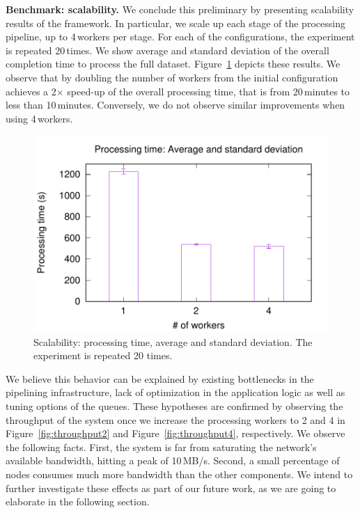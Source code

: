 \textbf{Benchmark: scalability.} We conclude this preliminary by presenting scalability results of the \SYS framework.
In particular, we scale up each stage of the processing pipeline, up to 4\,workers per stage.
For each of the configurations, the experiment is repeated 20\,times.
We show average and standard deviation of the overall completion time to process the full dataset.
Figure~\ref{fig:scalability} depicts these results.
We observe that by doubling the number of workers from the initial configuration achieves a 2$\times$ speed-up of the overall processing time, that is from 20\,minutes to less than 10\,minutes.
Conversely, we do not observe similar improvements when using 4\,workers.

\begin{figure}[t!]
  \centering
  \includegraphics[scale=0.5]{images/avg_stdev_4_streams}
  \caption{Scalability: processing time, average and standard deviation. The experiment is repeated 20 times.}
  \label{fig:scalability}
\end{figure}

We believe this behavior can be explained by existing bottlenecks in the pipelining infrastructure, lack of optimization in the application logic as well as tuning options of the \zmq queues.
These hypotheses are confirmed by observing the throughput of the system once we increase the processing workers to 2 and 4 in Figure~\ref{fig:throughput2} and Figure~\ref{fig:throughput4}, respectively.
We observe the following facts.
First, the system is far from saturating the network's available bandwidth, hitting a peak of 10\,MB/s.
Second, a small percentage of nodes consumes much more bandwidth than the other components.
We intend to further investigate these effects as part of our future work, as we are going to elaborate in the following section.

